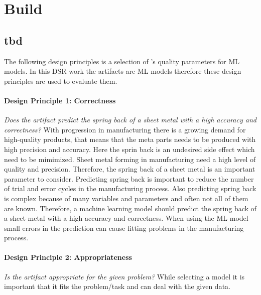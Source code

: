 
\chapter{Build}

\section{tbd}
The following design principles is a selection of \cite{siebert_constructionqualitymodel_}'s quality parameters for \ac{ML} models.
In this \ac{DSR} work the artifacts are \ac{ML} models therefore these design principles are used to evaluate them.

\subsubsection*{Design Principle 1: Correctness}
\textit{Does the artifact predict the spring back of a sheet metal with a high accuracy and correctness?}
With progression in manufacturing there is a growing demand for high-quality products, that means that the meta parts needs to be produced with high precision and accuracy. Here the sprin back is an undesired side effect which need to be mimimized. \cite[p. 1]{baig_machinelearningprediction_2021}
Sheet metal forming in manufacturing need a high level of quality and precision. Therefore, the spring back of a sheet metal is an important parameter to consider. \cite[p. 1]{cruz_applicationmachinelearning_2021}
Predicting spring back is important to reduce the number of trial and error cycles in the manufacturing process.
Also predicting spring back is complex because of many variables and parameters and often not all of them are known.
Therefore, a machine learning model should predict the spring back of a sheet metal with a high accuracy and correctness. When using the \ac{ML} model small errors in the prediction can cause fitting problems in the manufacturing process.


\subsubsection*{Design Principle 2: Appropriateness}
\textit{Is the artifact appropriate for the given problem?}
While selecting a model it is important that it fits the problem/task and can deal with the given data. \cite[p. 16]{siebert_constructionqualitymodel_}


